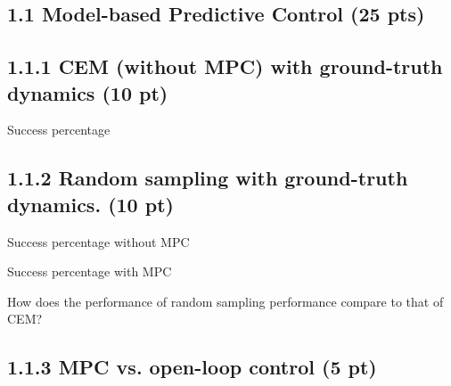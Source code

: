 \documentclass[12pt]{article}
\begin{document}
\subsection*{1.1 Model-based Predictive Control (25 pts)}

\subsection*{1.1.1 CEM (without MPC) with ground-truth dynamics (10 pt)}

Success percentage
\begin{tcolorbox}[fit,height=1cm, width=5cm, blank, borderline={1pt}{1pt},nobeforeafter]
\begin{center}
\end{center}
\end{tcolorbox}

\subsection*{1.1.2 Random sampling with ground-truth dynamics. (10 pt)}

Success percentage without MPC 
\begin{tcolorbox}[fit,height=1cm, width=5cm, blank, borderline={1pt}{1pt},nobeforeafter]
\begin{center}
\end{center}
\end{tcolorbox}

Success percentage with MPC 
\begin{tcolorbox}[fit,height=1cm, width=5cm, blank, borderline={1pt}{1pt},nobeforeafter]
\begin{center}
\end{center}
\end{tcolorbox}

How does the performance of random sampling performance compare to that of CEM?
\begin{tcolorbox}[fit,height=5em, width=40em, blank, borderline={1pt}{1pt},nobeforeafter]
\begin{center}
\end{center}
\end{tcolorbox}

\subsection*{1.1.3 MPC vs. open-loop control (5 pt)}
\end{document}
